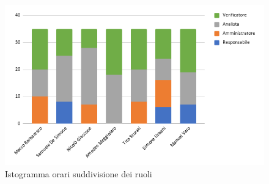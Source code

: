     \pagebreak

    \begin{figure}[!h]
            \caption{Istogramma orari suddivisione dei ruoli}
            \vspace{5px}
            \includegraphics[scale=0.6]{../../../Images/Diagrammi/Istogrammi/ore analisi.png}
            \centering
        \end{figure}
